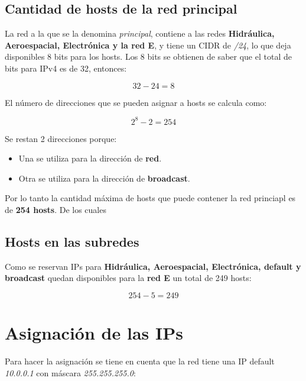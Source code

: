 \documentclass[letterpaper, 10 pt, conference]{ieeeconf}  %
\begin{document}
\subsection{Cantidad de hosts de la red principal}
La red a la que se la denomina \textit{principal}, contiene a las redes \textbf{Hidráulica, Aeroespacial, Electrónica y la red E}, y tiene un CIDR de \textit{/24}, lo que deja disponibles 8 bits para los hosts. Los 8 bits se obtienen de saber que el total de bits para IPv4 es de 32, entonces:

\begin{equation*}
	32 - 24 = 8
\end{equation*}

El número de direcciones que se pueden asignar a hosts se calcula como:

\begin{equation*}
	2^{8} - 2 = 254
\end{equation*}

Se restan 2 direcciones porque:
\begin{itemize}
	\item Una se utiliza para la dirección de \textbf{red}.
	\item Otra se utiliza para la dirección de \textbf{broadcast}.
\end{itemize}

Por lo tanto la cantidad máxima de hosts que puede contener la red princiapl es de \textbf{254 hosts}. De los cuales

\subsection{Hosts en las subredes}

Como se reservan IPs para \textbf{Hidráulica, Aeroespacial, Electrónica, default y broadcast} quedan disponibles para la \textbf{red E} un total de 249 hosts:

\begin{equation*}
	254 - 5 = 249
\end{equation*}

\section{Asignación de las IPs}

Para hacer la asignación se tiene en cuenta que la red tiene una IP default \textit{10.0.0.1} con máscara \textit{255.255.255.0}:

\end{document}
